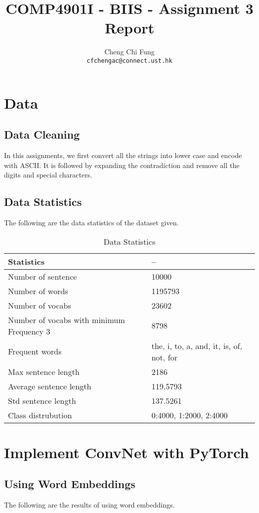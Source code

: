 \documentclass{article}
\title{COMP4901I - BIIS - Assignment 3 Report}
\author{%
	Cheng Chi Fung \\
	\texttt{cfchengac@connect.ust.hk} \\
}
\begin{document}
\maketitle

\section{Data}

\subsection{Data Cleaning}
In this assignments, we first convert all the strings into lower case and encode with ASCII. It is followed by expanding the contradiction and remove all the digits and special characters.

\subsection{Data Statistics}
The following are the data statistics of the dataset given.

\begin{table}[htb]
	\caption{Data Statistics}
	\label{sample-table}
	\centering
	\begin{tabular}{ll}
		\toprule
		\cmidrule{1-2}
		Statistics & --  \\
		\midrule
		Number of sentence & 10000 \\
		Number of words & 1195793  \\
		Number of vocabs & 23602 \\
		Number of vocabs with minimum Frequency 3 & 8798 \\
		Frequent words & the, i, to, a, and, it,  is, of, not, for \\
		Max sentence length & 2186  \\
		Average sentence length & 119.5793  \\
		Std sentence length & 137.5261 \\
		Class distrubution & {0:4000, 1:2000, 2:4000} \\
		\bottomrule
	\end{tabular}
\end{table}

\section{Implement ConvNet with PyTorch}

\subsection{Using Word Embeddings}
The following are the results of using word embeddings.
\end{document}
